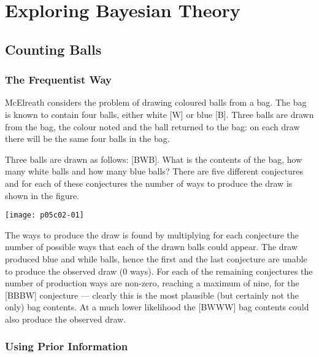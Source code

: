 
\chapter{Exploring Bayesian Theory}
\label{chap:ExploringBayesianTheory}



\section{Counting Balls}
\label{sec:CountingBalls}
\subsection{The Frequentist Way}
\label{sec:TheFrequentistWay}

McElreath \cite{McElreath2015} considers the problem of drawing coloured balls from a bag.  The bag is known to contain four balls, either white [W] or blue [B].  Three balls are drawn from the bag, the colour noted and the ball returned to the bag: on each draw there will be the same four balls in the bag.

Three balls are drawn as follows: [BWB]. What is the contents of the bag, how many white balls and how many blue balls?  There are five different conjectures and for each of these conjectures the number of ways to produce the draw is shown in the figure.
\begin{marginfigure}
\texttt{[image: p05c02-01]}
\end{marginfigure}
The ways to produce the draw is found by multiplying for each conjecture the number of possible ways that each of the drawn balls could appear.  The draw produced blue and while balls, hence the first and the last conjecture are unable to produce the observed draw (0 ways). For each of the remaining conjectures the number of production ways are non-zero, reaching a maximum of nine, for the [BBBW] conjecture --- clearly this is the most plausible (but certainly not the only) bag contents.  At a much lower likelihood the [BWWW] bag contents could also produce the observed draw.

\subsection{Using Prior Information}
\label{sec:UsingPriorInformation}

